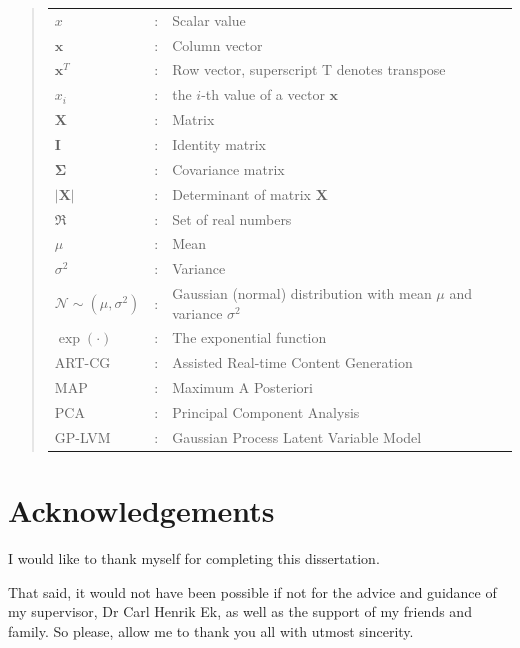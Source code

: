 \documentclass[ %
author={Dillon Keith Diep},
supervisor={Dr. Carl Henrik Ek},
degree={MEng},
title={ART-CG Hair:},
subtitle={Assisted Real-time Content Generation of Stylised Virtual Hair},
type={Research},
year={2017} ]{dissertation}
\begin{document}
	\begin{quote}
		\noindent
		\begin{tabular}{lcl}
			$x$                 &:  & Scalar value\\
			$\bm{x}$            &:  & Column vector\\
			$\bm{x}^T$          &:  & Row vector, superscript T denotes transpose\\
			$x_i$               &:  & the $i$-th value of a vector $\bm{x}$\\
			$\bm{X}$            &:  & Matrix\\
			$\bm{I}$            &:  & Identity matrix\\
			$\bm{\Sigma}$           &:  & Covariance matrix\\
			$|\bm{X}|$          &:  & Determinant of matrix $\bm{X}$\\
			$\Re$               &:  & Set of real numbers\\
			$\mu$               &:  & Mean\\
			$\sigma^2$          &:  & Variance\\
			$\mathcal{N}\sim(\mu, \sigma^2)$            &:  & Gaussian (normal) distribution with mean $\mu$ and variance $\sigma^2$\\
			$\exp(\bm{\cdot})$  &:  & The exponential function\\
			ART-CG              &:  & Assisted Real-time Content Generation\\
			MAP                 &:  & Maximum A Posteriori\\
			PCA                 &:  & Principal Component Analysis\\
			GP-LVM              &:  & Gaussian Process Latent Variable Model\\
		\end{tabular}
	\end{quote}
	
	
	\chapter*{Acknowledgements}
	
	I would like to thank myself for completing this dissertation. 
	
	\noindent
	That said, it would not have been possible if not for the advice and guidance of my supervisor, Dr Carl Henrik Ek, as well as the support of my friends and family. So please, allow me to thank you all with utmost sincerity.
	
\end{document}
